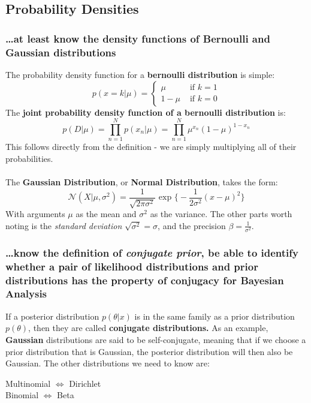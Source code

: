 \documentclass[11pt]{article} %
\begin{document}
\subsection{Probability Densities}

\subsubsection{\ldots at least know the density functions of Bernoulli and Gaussian distributions}

The probability density function for a {\bf bernoulli distribution} is simple:
\begin{equation}
p(x=k|\mu) =
\begin{cases}
\mu & \text{ if } k = 1 \\
1-\mu & \text{ if } k = 0
\end{cases}
\end{equation}
The {\bf joint probability density function of a bernoulli distribution} is:
\begin{equation}
p(D|\mu) = \prod_{n=1}^{N}p(x_n|\mu) = \prod_{n=1}^{N} \mu^{x_n}(1-\mu)^{1-x_n}
\end{equation}
This follows directly from the definition - we are simply multiplying all of their probabilities.\\
~\\
The {\bf Gaussian Distribution}, or {\bf Normal Distribution}, takes the form:
\begin{equation}
\mathcal{N}(X|\mu,\sigma^2) = \frac{1}{\sqrt{2 \pi \sigma^2}} \text{ exp } \Bigg\{ -\frac{1}{2 \sigma^2}(x-\mu)^2 \Bigg\}
\end{equation}
With arguments $\mu$ as the mean and $\sigma^2$ as the variance. The other parts worth noting is the {\em standard deviation} $\sqrt{\sigma^2} = \sigma$, and the precision $\beta = \frac{1}{\sigma^2}$.

\subsubsection{\ldots know the definition of {\em conjugate prior}, be able to identify whether a pair of likelihood distributions and prior distributions has the property of conjugacy for Bayesian Analysis}

If a posterior distribution $p(\theta|x)$ is in the same family as a prior distribution $p(\theta)$, then they are called {\bf conjugate distributions.} As an example, {\bf Gaussian} distributions are said to be self-conjugate, meaning that if we choose a prior distribution that is Gaussian, the posterior distribution will then also be Gaussian. The other distributions we need to know are:
\begin{center}
Multinomial $\Leftrightarrow$ Dirichlet \\
Binomial $\Leftrightarrow$ Beta
\end{center}
\end{document}
